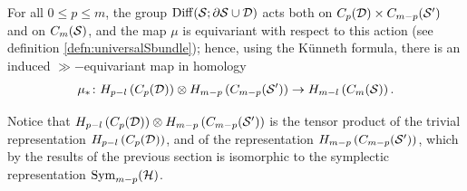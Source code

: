 For all $0\leq p\leq m$, the group $\operatorname{Diff}(\mathcal{S};\partial\mathcal{S}\cup\mathcal{D})$ acts both on $C_p(\mathcal{D})\times C_{m-p}(\mathcal{S}')$
and on $C_m(\mathcal{S})$, and the map $\mu$ is equivariant with respect to this action
(see definition \ref{defn:universalSbundle});
hence, using the K\"{u}nneth formula, there is an induced $\gg-$equivariant map in homology
\begin{equation}
 \label{eq:mu*}
 \mu_*\colon H_{p-l}\left(C_p(\mathcal{D})\right)\otimes H_{m-p}\left(C_{m-p}(\mathcal{S}')\right)\to H_{m-l}\left(C_m(\mathcal{S})\right).
\end{equation}

Notice that $H_{p-l}\left(C_p(\mathcal{D})\right)\otimes H_{m-p}\left(C_{m-p}(\mathcal{S}')\right)$
is the tensor product of the trivial representation $H_{p-l}\left(C_p(\mathcal{D})\right)$, and
of the representation $H_{m-p}\left(C_{m-p}(\mathcal{S}')\right)$, which by the results of the previous
section is isomorphic to the symplectic representation $\operatorname{Sym}_{m-p}(\mathcal{H})$.

